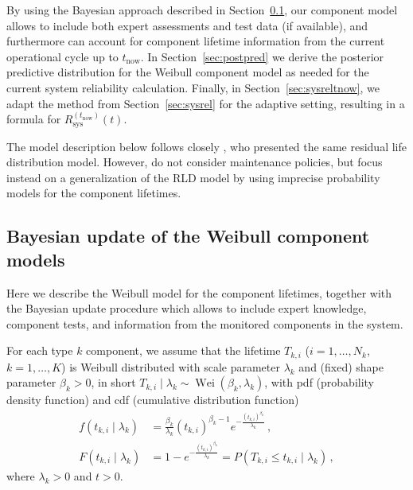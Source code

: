 \documentclass[authoryear]{elsarticle}
\newcommand{\wei}{\operatorname{Wei}} %
\def\tnow{t_\text{now}}
\newcommand{\Rsysnow}{R^{(t_\text{now})}_\text{sys}}
\begin{document}
By using the Bayesian approach described in Section~\ref{sec:weibull},
our component model allows to include both expert assessments and test data (if available),
and furthermore can account for component lifetime information from the current operational cycle up to $\tnow$.
%
In Section~\ref{sec:postpred} we derive the posterior predictive distribution
for the Weibull component model as needed for the current system reliability calculation.
Finally, in Section~\ref{sec:sysreltnow}, we adapt the method from Section~\ref{sec:sysrel} for the adaptive setting,
resulting in a formula for $\Rsysnow(t)$.

The model description below follows closely \cite[\S 2, \S 4.1 -- \S 4.3]{2016:walter-coolen},
who presented the same residual life distribution model.
However, \cite{2016:walter-coolen} do not consider maintenance policies,
but focus instead on a generalization of the RLD model by using imprecise probability models for the component lifetimes.


\subsection{Bayesian update of the Weibull component models}
\label{sec:weibull}

Here we describe the Weibull model for the component lifetimes,
together with the Bayesian update procedure which allows to include
expert knowledge, component tests, and information from the monitored components in the system.

For each type $k$ component, we assume that the lifetime $T_{k,i}$ ($i=1,\ldots,N_k$, $k = 1, \ldots, K$)
is Weibull distributed with scale parameter $\lambda_k$ and (fixed) shape parameter $\beta_k > 0$,
in short $T_{k,i} \mid \lambda_k \sim \wei(\beta_k,\lambda_k)$,
with pdf (probability density function) and cdf (cumulative distribution function)
\begin{align}
\label{eq:weibulldens}
f(t_{k,i} \mid \lambda_k) &= \frac{\beta_k}{\lambda_k} (t_{k,i})^{\beta_k-1} e^{-\frac{(t_{k,i})^{\beta_k}}{\lambda_k}}\,, \\
\label{eq:weibullcdf}
F(t_{k,i} \mid \lambda_k) &= 1 - e^{-\frac{(t_{k,i})^{\beta_k}}{\lambda_k}} = P(T_{k,i} \leq t_{k,i} \mid \lambda_k)\,,
\end{align}
where $\lambda_k > 0$ and $t > 0$.
\end{document}
